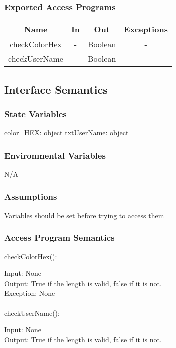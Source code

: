 \documentclass[12pt, titlepage]{article}
\begin{document}
		\subsubsection{Exported Access Programs}
		
	\begin{tabular}[pos]{|c|c|c|c|}
	\hline
	\textbf{Name}& \textbf{In} & \textbf{Out} & \textbf{Exceptions} \\ 
	\hline
	checkColorHex & - & Boolean & -\\ 
	\hline
	checkUserName & - & Boolean & -\\ 
	\hline
	
					
	\end{tabular}		
		
	\subsection{Interface Semantics}
		\subsubsection{State Variables}
		color\_HEX: object
		txtUserName: object
		\subsubsection{Environmental Variables}
		N/A
		\subsubsection{Assumptions}
Variables should be set before trying to access them

		\subsubsection{Access Program Semantics}
		
		checkColorHex():
		
		Input: None\\
		
		Output: True if the length is valid, false if it is not.\\
		
		Exception: None\\
		\\
		checkUserName():
		
		Input: None\\
		
		Output: True if the length is valid, false if it is not.\\
		
\end{document}
